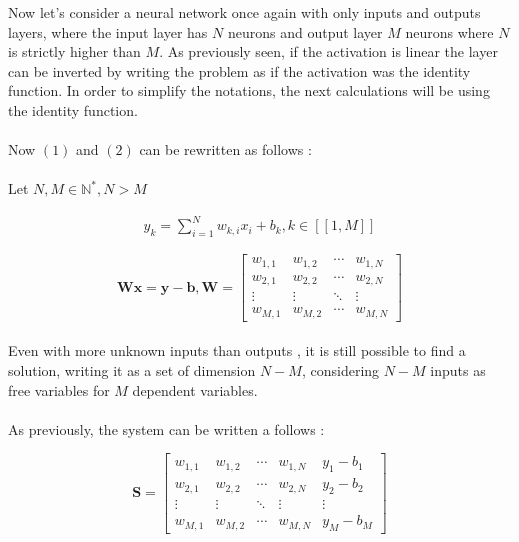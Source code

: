 \documentclass{article}
\begin{document}
Now let’s consider a neural network once again with only inputs and outputs layers, 
where the input layer has $N$ neurons and output layer $M$ neurons where $N$ is strictly higher than $M$.
As previously seen, if the activation is linear the layer can be inverted by writing the problem as if the activation was the identity function.
In order to simplify the notations, the next calculations will be using the identity function.
\\\\
Now $(1)$ and $(2)$ can be rewritten as follows : 
\\
\\
Let $ N,M \in \mathbb{N^{*}},N>M$

\begin{align}
    y_{k} = \sum_{i=1}^{N} w_{k,i}x_{i} + b_{k} ,  k \in [\![1,M]\!]
\end{align}

\begin{equation}
    \textbf{W}\textbf{x}=\textbf{y}-\textbf{b},\textbf{W}= 
    \begin{bmatrix}
    w_{1,1} & w_{1,2} & \cdots & w_{1,N} \\
    w_{2,1} & w_{2,2} & \cdots & w_{2,N} \\
    \vdots  & \vdots  & \ddots & \vdots  \\
    w_{M,1} & w_{M,2} & \cdots & w_{M,N} 
    \end{bmatrix}
    \end{equation}
\\
    Even with more unknown inputs than outputs , 
    it is still possible to find a solution, writing it as a set of dimension $N-M$, considering $N-M$ inputs as free variables for $M$ dependent variables.
    \\
    \\
    As previously, the system can be written a follows : 

    \begin{equation*}
        \textbf{S}= \left[\begin{array}{cccc|c}  
        w_{1,1} & w_{1,2} & \cdots & w_{1,N} & y_{1}-b_{1} \\
        w_{2,1} & w_{2,2} & \cdots & w_{2,N} & y_{2}-b_{2}\\
        \vdots  & \vdots  & \ddots & \vdots & \vdots\\
        w_{M,1} & w_{M,2} & \cdots & w_{M,N} & y_{M}-b_{M}
       \end{array}\right]
    \end{equation*}
\end{document}
